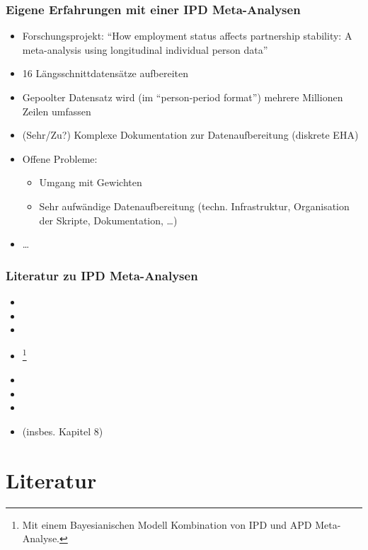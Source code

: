 \begin{frame}\frametitle{Eigene Erfahrungen mit einer IPD Meta-Analysen}
  \begin{itemize}
  \item Forschungsprojekt: "`How employment status affects partnership stability: A meta-analysis using longitudinal individual person data"'
  \item 16 Längsschnittdatensätze aufbereiten
  \item Gepoolter Datensatz wird (im "`person-period format"') mehrere Millionen Zeilen umfassen
  \item (Sehr/Zu?) Komplexe Dokumentation zur Datenaufbereitung (diskrete EHA)
  \item Offene Probleme:
    \begin{itemize}
    \item Umgang mit Gewichten
    \item Sehr aufwändige Datenaufbereitung (techn. Infrastruktur, Organisation der Skripte, Dokumentation, \ldots)
    \end{itemize}
  \item \ldots
  \end{itemize}
\end{frame}


\begin{frame}[allowframebreaks]\frametitle{Literatur zu IPD Meta-Analysen}
  \begin{footnotesize}
    \begin{itemize}
    \item {}
    \item {}
    \item {}
    \item {}\footnote{Mit einem Bayesianischen Modell Kombination von IPD und
        APD Meta-Analyse.}
    \item {}
    \item {}
    \item {}
    \item {} (insbes. Kapitel 8)
    \end{itemize}
  \end{footnotesize}
\end{frame}


\section{Literatur}

